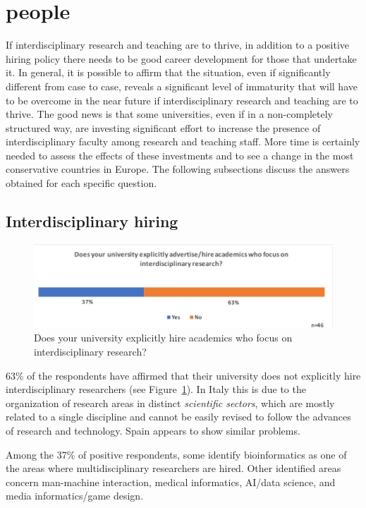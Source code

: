 \newpage
\section{people}

If interdisciplinary research and teaching are to thrive, in addition to a positive hiring policy there needs to be good career development for those that undertake it.
 In general, it is possible to affirm that the situation,
even if significantly different from case to case, reveals a
significant level of immaturity that will have to be overcome in the
near future if interdisciplinary research and teaching are to thrive. The good news is that some universities, even if in
a non-completely structured way, are investing significant effort to
increase the presence of interdisciplinary faculty among research and
teaching staff. More time is certainly needed to assess the
effects of these investments and to see a change in the most
conservative countries in Europe. The 
following subsections discuss the answers obtained for each specific
question.

\subsection{Interdisciplinary hiring}\label{sec:hiring}

\begin{figure}[h]
\centering
\includegraphics[width = \linewidth]{charts/3a.jpg}
\caption{Does your university explicitly hire academics
  who focus on interdisciplinary research?}
\label{sect3:hirings}
\end{figure}

63\% of the respondents have affirmed that their university does not
explicitly hire interdisciplinary researchers (see Figure~\ref{sect3:hirings}). In Italy this is 
due to the organization of research areas in distinct \emph{scientific
  sectors}, which are mostly related to a single discipline and cannot be easily revised to follow the advances of
research and technology. Spain appears to show similar problems.

Among the 37\% of positive respondents, some identify bioinformatics
as one of the areas where multidisciplinary researchers are hired. 
Other identified areas concern man-machine interaction, medical
informatics, AI/data science, and media informatics/game design.

